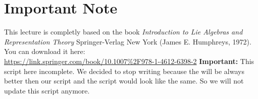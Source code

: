 
\setcounter{chapter}{-1}
\chapter{Important Note}\label{chapter0}
This lecture is completly based on the book
\textit{Introduction to Lie Algebras and Representation Theory}
Springer-Verlag New York (James E. Humphreys, 1972). You can download it here:\\
\url{https://link.springer.com/book/10.1007\%2F978-1-4612-6398-2}\nl
\textbf{Important:} This script here incomplete. We decided to stop writing because the will be always better then our script and the script would look like the same. So we will not update this script anymore.